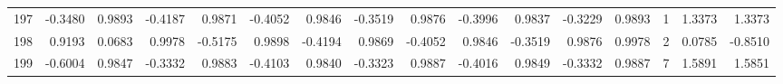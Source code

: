 \begin{tabular}{lrrrrrrrrrrrrrrr}
197 &     -0.3480 &  0.9893 & -0.4187 &  0.9871 & -0.4052 &  0.9846 & -0.3519 &  0.9876 & -0.3996 &  0.9837 &  -0.3229 &     0.9893 &      1 &                    1.3373 &                     1.3373 \\
198 &      0.9193 &  0.0683 &  0.9978 & -0.5175 &  0.9898 & -0.4194 &  0.9869 & -0.4052 &  0.9846 & -0.3519 &   0.9876 &     0.9978 &      2 &                    0.0785 &                    -0.8510 \\
199 &     -0.6004 &  0.9847 & -0.3332 &  0.9883 & -0.4103 &  0.9840 & -0.3323 &  0.9887 & -0.4016 &  0.9849 &  -0.3332 &     0.9887 &      7 &                    1.5891 &                     1.5851 \\
\bottomrule
\end{tabular}
